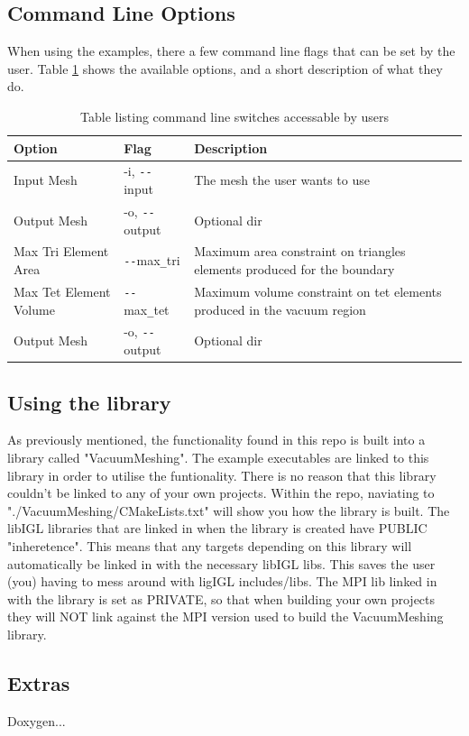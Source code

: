 \documentclass[12pt, letterpaper]{article}
\begin{document}
\newpage

\subsection{Command Line Options} \label{CLFlags}
When using the examples, there a few command line flags that can be set by the user. Table \ref{CLFlagsTab} shows the available options, and a short description of what they do.

\begin{table}[ht!]
\begin{center}
\begin{tabularx}{0.9\textwidth}{
  | >{\raggedright\arraybackslash}X 
  | >{\raggedright\arraybackslash}X 
  | >{\raggedright\arraybackslash}X | }
  \hline
  \textbf{Option} & \textbf{Flag} & \textbf{Description} \\
  \hline
  \hline
  Input Mesh & -i, \texttt{-{}-}input & The mesh the user wants to use\\
  \hline
  Output Mesh & -o, \texttt{-{}-}output & Optional dir\\
  \hline 
  Max Tri Element Area & \texttt{-{}-}max\texttt{\_}tri & Maximum area constraint on triangles elements produced for the boundary\\
  \hline 
  Max Tet Element Volume & \texttt{-{}-}max\texttt{\_}tet & Maximum volume constraint on tet elements produced in the vacuum region\\
  \hline 
  Output Mesh & -o, \texttt{-{}-}output & Optional dir\\
  \hline
\end{tabularx}
\caption{Table listing command line switches accessable by users}
\label{CLFlagsTab}
\end{center}
\end{table}


\subsection{Using the library}
As previously mentioned, the functionality found in this repo is built into a library called "VacuumMeshing". The example executables are linked to this library in order to utilise the funtionality. There is no reason that this library couldn't be linked to any of your own projects. Within the repo, naviating to "./VacuumMeshing/CMakeLists.txt" will show you how the library is built. The libIGL libraries that are linked in when the library is created have PUBLIC "inheretence". This means that any targets depending on this library will automatically be linked in with the necessary libIGL libs. This saves the user (you) having to mess around with ligIGL includes/libs. The MPI lib linked in with the library is set as PRIVATE, so that when building your own projects they will NOT link against the MPI version used to build the VacuumMeshing library.

\subsection{Extras}
Doxygen...
\end{document}
